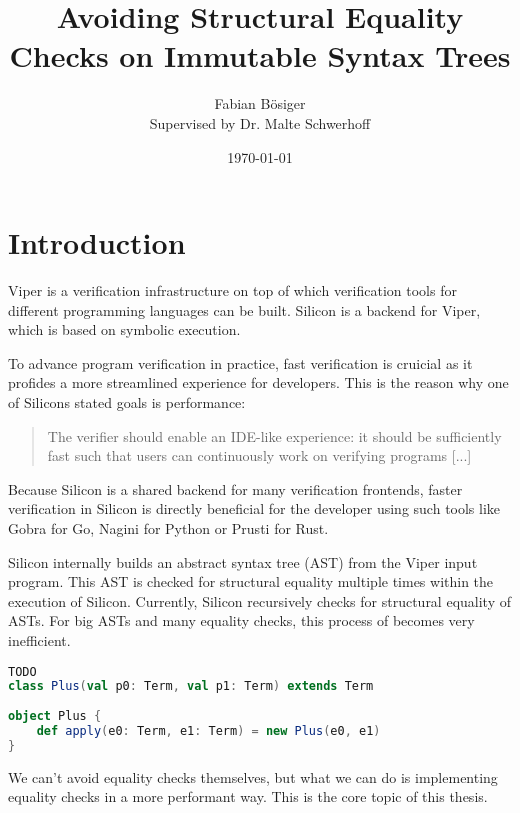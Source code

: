 \documentclass{article}
\title{Avoiding Structural Equality Checks on Immutable Syntax Trees}
\author{
    Fabian Bösiger\\
    Supervised by Dr. Malte Schwerhoff
}
\date{\today}
\begin{document}
    \maketitle
    \newpage

    \section{Introduction} \label{introduction}
    Viper \cite{viper} is a verification infrastructure on top of which verification tools
    for different programming languages can be built. Silicon \cite{silicon} is a backend for Viper,
    which is based on symbolic execution.
    
    To advance program verification in practice, fast verification is cruicial as
    it profides a more streamlined experience for developers. This is the reason
    why one of Silicons stated goals is performance:

    \begin{quotation}
        The verifier should enable an IDE-like experience: it should be
        sufficiently fast such that users can continuously work on verifying
        programs [...] \cite{silicon}
    \end{quotation}

    Because Silicon is a shared backend for many verification frontends, faster
    verification in Silicon is directly beneficial for the developer using
    such tools like Gobra for Go, Nagini for Python or Prusti for Rust.

    Silicon internally builds an abstract syntax tree (AST) from the Viper input
    program. This AST is checked for structural equality multiple times within
    the execution of Silicon. Currently, Silicon recursively checks for structural
    equality of ASTs. For big ASTs and many equality checks, this process of becomes
    very inefficient.

    \begin{lstlisting}[language=Scala, caption=Example of a term equality check.]
TODO
class Plus(val p0: Term, val p1: Term) extends Term
    
object Plus {
    def apply(e0: Term, e1: Term) = new Plus(e0, e1)
}
    \end{lstlisting}
    
    We can't avoid equality checks themselves, but what we can do is implementing
    equality checks in a more performant way. This is the core topic of this thesis.
    
\end{document}
